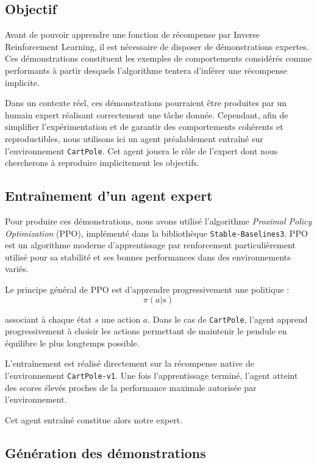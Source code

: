 \subsection{Objectif}

Avant de pouvoir apprendre une fonction de récompense par Inverse Reinforcement Learning, il est nécessaire de disposer de démonstrations expertes. Ces démonstrations constituent les exemples de comportements considérés comme performants à partir desquels l’algorithme tentera d’inférer une récompense implicite.

Dans un contexte réel, ces démonstrations pourraient être produites par un humain expert réalisant correctement une tâche donnée. Cependant, afin de simplifier l’expérimentation et de garantir des comportements cohérents et reproductibles, nous utilisons ici un agent préalablement entraîné sur l’environnement \texttt{CartPole}. Cet agent jouera le rôle de l’expert dont nous chercherons à reproduire implicitement les objectifs.

\subsection{Entraînement d’un agent expert}

Pour produire ces démonstrations, nous avons utilisé l’algorithme \textit{Proximal Policy Optimization} (PPO), implémenté dans la bibliothèque \texttt{Stable-Baselines3}. PPO est un algorithme moderne d’apprentissage par renforcement particulièrement utilisé pour sa stabilité et ses bonnes performances dans des environnements variés.

Le principe général de PPO est d’apprendre progressivement une politique :
\[
\pi(a|s)
\]

associant à chaque état \(s\) une action \(a\). Dans le cas de \texttt{CartPole}, l’agent apprend progressivement à choisir les actions permettant de maintenir le pendule en équilibre le plus longtemps possible.

L’entraînement est réalisé directement sur la récompense native de l’environnement \texttt{CartPole-v1}. Une fois l’apprentissage terminé, l’agent atteint des scores élevés proches de la performance maximale autorisée par l’environnement.

Cet agent entraîné constitue alors notre expert.

\subsection{Génération des démonstrations}


